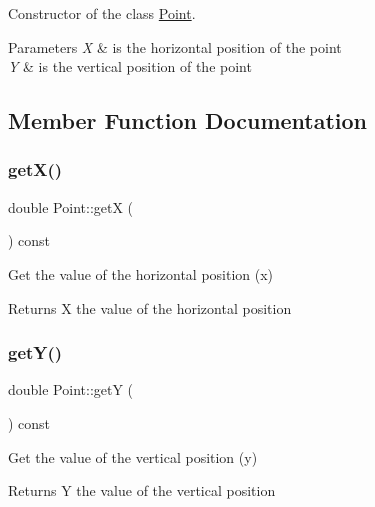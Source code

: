 Constructor of the class \hyperlink{class_point}{Point}. 


\begin{DoxyParams}{Parameters}
{\em X} & is the horizontal position of the point \\
\hline
{\em Y} & is the vertical position of the point \\
\hline
\end{DoxyParams}


\subsection{Member Function Documentation}
\hypertarget{class_point_a655794dd595a4821987664bf1d9010e8}{}\label{class_point_a655794dd595a4821987664bf1d9010e8} 
\subsubsection{\texorpdfstring{get\+X()}{getX()}}
{\footnotesize\ttfamily double Point\+::getX (\begin{DoxyParamCaption}{ }\end{DoxyParamCaption}) const}



Get the value of the horizontal position (x) 

\begin{DoxyReturn}{Returns}
X the value of the horizontal position 
\end{DoxyReturn}
\hypertarget{class_point_aa323a12bec85e28ce6575dccec4f8b28}{}\label{class_point_aa323a12bec85e28ce6575dccec4f8b28} 
\subsubsection{\texorpdfstring{get\+Y()}{getY()}}
{\footnotesize\ttfamily double Point\+::getY (\begin{DoxyParamCaption}{ }\end{DoxyParamCaption}) const}



Get the value of the vertical position (y) 

\begin{DoxyReturn}{Returns}
Y the value of the vertical position 
\end{DoxyReturn}
\hypertarget{class_point_a698b03ed343ee2971a279ed196e80b6b}{}\label{class_point_a698b03ed343ee2971a279ed196e80b6b} 

